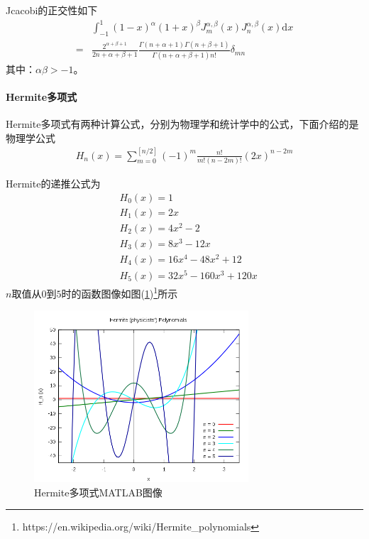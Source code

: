                 \par
                Jcacobi的正交性如下
                \begin{align*}
                    &\int_{-1}^1 (1-x)^\alpha(1+x)^\beta J_m^{\alpha ,\beta}(x)J_n^{\alpha ,\beta}(x) \mathrm{d}x \\
                    ={}&\frac{2^{\alpha + \beta + 1}}{2n+ \alpha + \beta + 1} \frac{\Gamma(n+ \alpha  + 1) \Gamma(n+ \beta  + 1)}{\Gamma(n+ \alpha +\beta + 1) n!} \delta_{mn}
                \end{align*}
                其中：$\alpha\beta >-1$。

                \paragraph{Hermite多项式}
                Hermite多项式有两种计算公式，分别为物理学和统计学中的公式，下面介绍的是物理学公式
                \begin{align}
                    \label{eq:Hermite多项式一般形式}
                    H_n(x) = \sum_{m= 0}^{[n/2]}(-1)^m \frac{n!}{m!(n - 2m)!} (2x)^{n-2m}
                \end{align}
                \par
                Hermite的递推公式为
                \begin{align*}
                    &H_0(x)= 1 \\
                    &H_1(x) = 2x\\
                    &H_2(x) = 4x^2 -2\\
                    &H_3(x) = 8x^3 - 12x\\
                    &H_4(x) = 16x^4 - 48x^2 +12\\
                    &H_5 (x) = 32x^5 - 160x^3+120x
                \end{align*}
                $n$取值从$0$到$5$时的函数图像如图(\ref{fig:Hermite多项式MATLAB图像})\footnote{https://en.wikipedia.org/wiki/Hermite\_polynomials}所示
                \begin{figure}[H]
                \centering
                \includegraphics[width=8cm]{images/Hermite_polynomial_matlab_pic.png}
                \caption{Hermite多项式MATLAB图像}
                \label{fig:Hermite多项式MATLAB图像}
                \end{figure}
